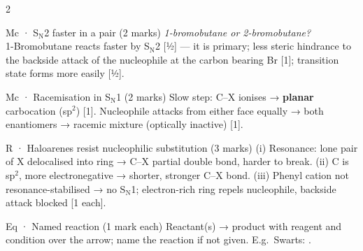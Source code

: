 \documentclass[10pt,a4paper]{extarticle}
\newcommand{\mk}[1]{{\scriptsize\color{black!55}[#1]}}
\begin{document}
\begin{multicols}{2}
\begin{skel}{Mc · S$_\text{N}$2 faster in a pair (2 marks)}
\textit{1-bromobutane or 2-bromobutane?}\\
1-Bromobutane reacts faster by S$_\text{N}$2 \mk{½} — it is primary; less steric hindrance to the backside attack of the nucleophile at the carbon bearing Br \mk{1}; transition state forms more easily \mk{½}.
\end{skel}
\begin{skel}{Mc · Racemisation in S$_\text{N}$1 (2 marks)}
Slow step: C--X ionises → \textbf{planar} carbocation (sp$^2$) \mk{1}. Nucleophile attacks from either face equally → both enantiomers → racemic mixture (optically inactive) \mk{1}.
\end{skel}
\begin{skel}{R · Haloarenes resist nucleophilic substitution (3 marks)}
(i) Resonance: lone pair of X delocalised into ring → C--X partial double bond, harder to break. (ii) C is sp$^2$, more electronegative → shorter, stronger C--X bond. (iii) Phenyl cation not resonance-stabilised → no S$_\text{N}$1; electron-rich ring repels nucleophile, backside attack blocked \mk{1 each}.
\end{skel}
\begin{skel}{Eq · Named reaction (1 mark each)}
Reactant(s) → product with reagent and condition over the arrow; name the reaction if not given. E.g.\ Swarts: .
\end{skel}


\end{multicols}
\end{document}
